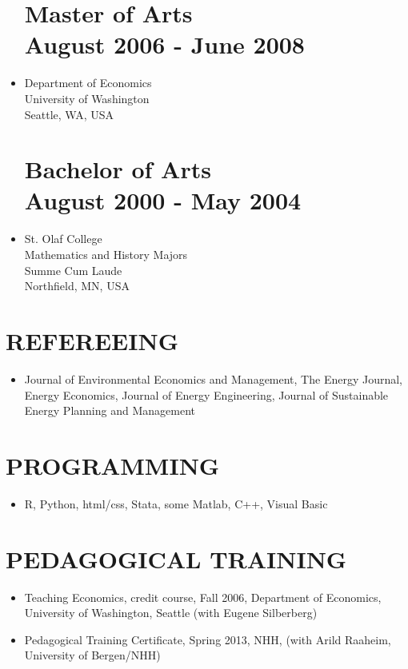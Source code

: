 \documentclass[margin]{res}
\begin{document}
\begin{resume}
\begin{itemize}
\normalsize{\section{\bf Master of Arts \\ August 2006 - June 2008}}
\item[] Department of Economics \\
University of Washington \\
Seattle, WA, USA \\

\normalsize{\section{\bf Bachelor of Arts \\ August 2000 - May 2004}}
\item[] St. Olaf College  \\
Mathematics and History Majors \\
Summe Cum Laude \\
Northfield, MN, USA \\
\end{itemize}

\section{REFEREEING}  
\begin{itemize}
\item[] Journal of Environmental Economics and Management, The Energy Journal, Energy Economics, Journal of Energy Engineering, Journal of Sustainable Energy Planning and Management
 \end{itemize}

\section{PROGRAMMING}
\begin{itemize}
  \item[] R, Python, html/css, Stata, some Matlab, C++, Visual Basic
\end{itemize}

\section{PEDAGOGICAL TRAINING}
\begin{itemize}
\setlength{\itemsep}{10pt}
\item[] Teaching Economics, credit course, Fall 2006, Department of Economics, University of Washington, Seattle (with Eugene Silberberg)

\item[] Pedagogical Training Certificate, Spring 2013, NHH, (with Arild Raaheim, University of Bergen/NHH)
\end{itemize}



\end{resume} 
\end{document}
